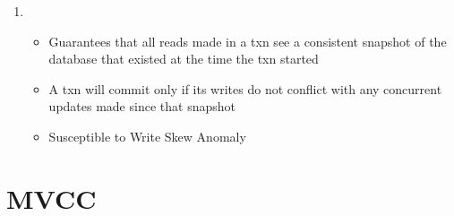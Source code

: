 \documentclass[11pt]{article}
\begin{document}
\begin{itemize}
\begin{enumerate}
\begin{itemize}
        \end{itemize}
        \item {}
        \begin{itemize}
            \item Guarantees that all reads made in a txn see a consistent snapshot of the database that existed at the time the txn started
            \item A txn will commit only if its writes do not conflict with any concurrent updates made since that snapshot
            \item Susceptible to Write Skew Anomaly
        \end{itemize}
    \end{enumerate}
\end{itemize}

\section{MVCC}
\end{document}
